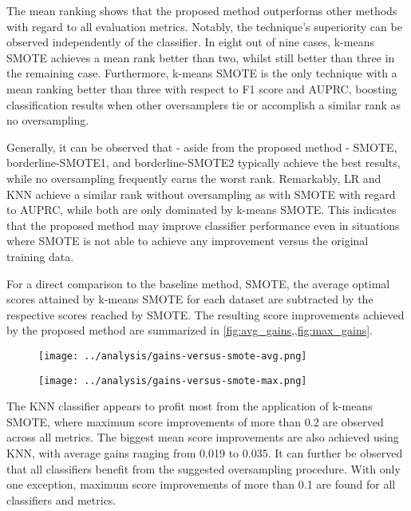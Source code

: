 \documentclass[sort&compress]{elsarticle}
\begin{document}
The mean ranking shows that the proposed method outperforms other methods with
regard to all evaluation metrics. Notably, the technique's superiority can be
observed independently of the classifier. In eight out of nine cases, k-means
\ac{SMOTE} achieves a mean rank better than two, whilst still better than three
in the remaining case. Furthermore, k-means \ac{SMOTE} is the only technique
with a mean ranking better than three with respect to F1 score and \ac{AUPRC},
boosting classification results when other oversamplers tie or accomplish a
similar rank as no oversampling.

Generally, it can be observed that - aside from the proposed method -
\ac{SMOTE}, borderline-\ac{SMOTE}1, and borderline-\ac{SMOTE}2 typically achieve
the best results, while no oversampling frequently earns the worst rank.
Remarkably, \ac{LR} and \ac{KNN} achieve a similar rank without oversampling as
with \ac{SMOTE} with regard to \ac{AUPRC}, while both are only dominated by
k-means \ac{SMOTE}. This indicates that the proposed method may improve
classifier performance even in situations where \ac{SMOTE} is not able to
achieve any improvement versus the original training data.

For a direct comparison to the baseline method, \ac{SMOTE}, the average optimal
scores attained by k-means \ac{SMOTE} for each dataset are subtracted by the
respective scores reached by \ac{SMOTE}. The resulting score improvements
achieved by the proposed method are summarized in
\cref{fig:avg_gains,,fig:max_gains}.

\begin{figure}[ht]
	\centering
	\begin{minipage}{.48\textwidth}
		\centering
		\texttt{[image: ../analysis/gains-versus-smote-avg.png]}
		\label{fig:avg_gains}
	\end{minipage}%
	\hfill
	\begin{minipage}{.48\textwidth}
		\centering
		\texttt{[image: ../analysis/gains-versus-smote-max.png]}
		\label{fig:max_gains}
	\end{minipage}
\end{figure}

The \ac{KNN} classifier appears to profit most from the application of k-means
\ac{SMOTE}, where maximum score improvements of more than 0.2 are observed
across all metrics. The biggest mean score improvements are also achieved using
\ac{KNN}, with average gains ranging from 0.019 to 0.035. It can further be
observed that all classifiers benefit from the suggested oversampling procedure.
With only one exception, maximum score improvements of more than 0.1 are found
for all classifiers and metrics.
\end{document}
